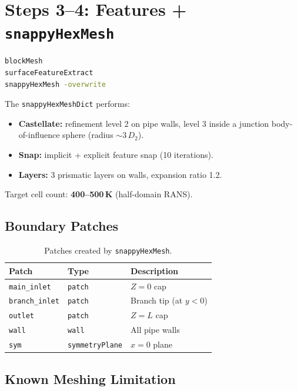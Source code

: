 \documentclass[12pt,a4paper]{report}
\begin{document}
\section{Steps 3--4: Features + \texttt{snappyHexMesh}}

\begin{lstlisting}[language=bash,numbers=none]
blockMesh
surfaceFeatureExtract
snappyHexMesh -overwrite
\end{lstlisting}

\noindent The \texttt{snappyHexMeshDict} performs:

\begin{itemize}
  \item \textbf{Castellate:} refinement level 2 on pipe walls,
        level 3 inside a junction body-of-influence sphere
        (radius $\sim 3\,D_2$).
  \item \textbf{Snap:} implicit + explicit feature snap (10 iterations).
  \item \textbf{Layers:} 3 prismatic layers on walls, expansion ratio
        1.2.
\end{itemize}

Target cell count: \textbf{400--500\,K} (half-domain RANS).

\subsection{Boundary Patches}

\begin{table}[H]
\centering
\caption{Patches created by \texttt{snappyHexMesh}.}
\begin{tabular}{@{}lll@{}}
\toprule
\textbf{Patch} & \textbf{Type} & \textbf{Description} \\
\midrule
\texttt{main\_inlet}   & \texttt{patch} & $Z = 0$ cap \\
\texttt{branch\_inlet}  & \texttt{patch} & Branch tip (at $y < 0$) \\
\texttt{outlet}         & \texttt{patch} & $Z = L$ cap \\
\texttt{wall}           & \texttt{wall}  & All pipe walls \\
\texttt{sym}            & \texttt{symmetryPlane} & $x = 0$ plane \\
\bottomrule
\end{tabular}
\end{table}

\subsection{Known Meshing Limitation}
\end{document}
